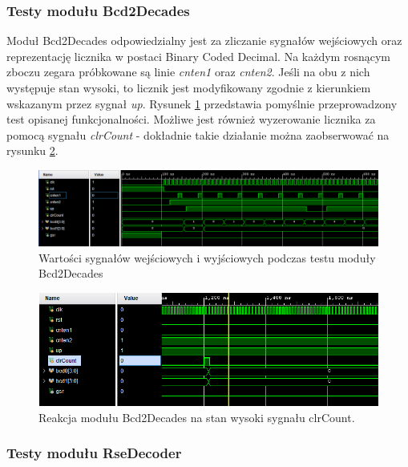 \documentclass[12pt] {article}
\begin{document}
\subsubsection{Testy modułu Bcd2Decades}
Moduł Bcd2Decades odpowiedzialny jest za zliczanie sygnałów wejściowych oraz reprezentację licznika w postaci Binary Coded Decimal. Na każdym rosnącym zboczu zegara próbkowane są linie \textit{cnten1} oraz \textit{cnten2}. Jeśli na obu z nich występuje stan wysoki, to licznik jest modyfikowany zgodnie z kierunkiem wskazanym przez sygnał \textit{up}. Rysunek \ref{fig:behavBcd2Dec1} przedstawia pomyślnie przeprowadzony test opisanej funkcjonalności. Możliwe jest również wyzerowanie licznika za pomocą sygnału \textit{clrCount} - dokładnie takie działanie można zaobserwować na rysunku \ref{fig:behavBcd2Dec2}.


\begin{figure}[H]
\centering
\includegraphics[width=\textwidth]{res/behav_sims/Bcd2Dec_behavSim_1.png}
\caption{Wartości sygnałów wejściowych i wyjściowych podczas testu moduły Bcd2Decades}
\label{fig:behavBcd2Dec1}
\end{figure}

\begin{figure}[H]
\centering
\includegraphics[width=\textwidth]{res/behav_sims/Bcd2Dec_behavSim_2.png}
\caption{Reakcja modułu Bcd2Decades na stan wysoki sygnału clrCount.}
\label{fig:behavBcd2Dec2}
\end{figure}





\subsubsection{Testy modułu RseDecoder}
\end{document}
